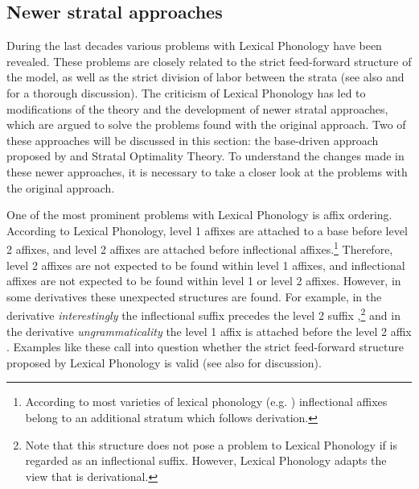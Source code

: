 \subsection{Newer stratal approaches}

During the last decades various problems with Lexical Phonology have been revealed. These problems are closely related to the strict feed-forward structure of the model, as well as the strict division of labor between the strata (see also \citealt[chapter 2]{Giegerich.1999} and \citealt[chapter 7]{Plag.2003} for a thorough discussion). The criticism of Lexical Phonology has led to modifications of the theory and the development of newer stratal approaches, which are argued to solve the problems found with the original approach. Two of these approaches will be discussed in this section: the base-driven approach proposed by \cite{Giegerich.1999} and Stratal Optimality Theory. To understand the changes made in these newer approaches, it is necessary to take a closer look at the problems with the original approach.

One of the most prominent problems with Lexical Phonology is affix ordering. According to Lexical Phonology, level 1 affixes are attached to a base before level 2 affixes, and level 2 affixes are attached before inflectional affixes.\footnote{According to most varieties of lexical phonology (e.g.  \citealt{Kiparsky.1982,Mohanan.1986}) inflectional affixes belong to an additional stratum which follows derivation.} Therefore, level 2 affixes are not expected to be found within level 1 affixes, and inflectional affixes are not expected to be found within level 1 or level 2 affixes. However, in some derivatives these unexpected structures are found. For example, in the derivative \textit{interestingly} the inflectional suffix  precedes the level 2 suffix ,\footnote{Note that this structure does not pose a problem to Lexical Phonology if  is regarded as an inflectional suffix. However, Lexical Phonology adapts the view that  is derivational. } and in the derivative \textit{ungrammaticality} the level 1 affix  is attached before the level 2 affix . Examples like these call into question whether the strict feed-forward structure proposed by Lexical Phonology is valid (see also \citet[chapter 4]{Plag.1999} for discussion).

